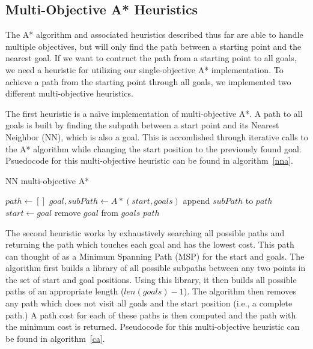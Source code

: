 \documentclass[12pt, conference, compsocconf]{IEEEtran}
\begin{document}
\subsection{Multi-Objective A* Heuristics}
The A* algorithm and associated heuristics described thus far are able to
handle multiple objectives, but will only find the path between a starting
point and the nearest goal. If we want to contruct the path from a starting
point to all goals, we need a heuristic for utilizing our single-objective A*
implementation.  To achieve a path from the starting point through all goals,
we implemented two different multi-objective heuristics.

The first heuristic is a na\"{\i}ve implementation of multi-objective A*.  A
path to all goals is built by finding the subpath between a start point and its
Nearest Neighbor (NN), which is also a goal.  This is accomlished through
iterative calls to the A* algorithm while changing the start position to the
previously found goal.  Psuedocode for this multi-objective heuristic can be
found in algorithm~\ref{nna}.

\begin{algorithm}
    \caption{NN multi-objective A*}
    \label{nna}
    \begin{algorithmic}[1]
        \State $path\gets []$
        \State $goal, subPath\gets A*(start, goals)$
        \State append $subPath$ to $path$
        \State $start\gets goal$
        \State remove $goal$ from $goals$
        \EndWhile
        \Return $path$
        \EndProcedure
    \end{algorithmic}
\end{algorithm}

The second heuristic works by exhaustively searching all possible paths and
returning the path which touches each goal and has the lowest cost.  This path
can thought of as a Minimum Spanning Path (MSP) for the start and goals.  The
algorithm first builds a library of all possible subpaths between any two
points in the set of start and goal positions.  Using this library, it then
builds all possible paths of an appropriate length ($len(goals)-1$).  The
algorithm then removes any path which does not visit all goals and the start
position (i.e., a complete path.)  A path cost for each of these paths is then
computed and the path with the minimum cost is returned.  Pseudocode for this
multi-objective heuristic can be found in algorithm~\ref{ca}.
\end{document}
